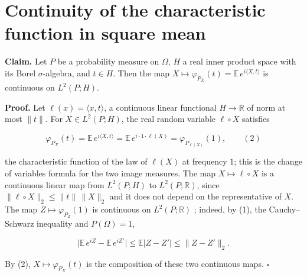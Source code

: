 \documentclass[11pt,a4paper]{article}
\begin{document}
\section{\texorpdfstring{Continuity of the characteristic function in square mean}{Continuity of the characteristic function in square mean}}


\textbf{Claim.} Let \(P\) be a probability measure on \(\Omega\), \(H\) a real inner product space with its Borel \(\sigma\)-algebra, and \(t\in H\). Then the map \(X\mapsto\varphi_{P_X}(t)=\mathbb E\,e^{i\langle X,t\rangle}\) is continuous on \(L^2(P;H)\).




\textbf{Proof.} Let \(\ell(x)=\langle x,t\rangle\), a continuous linear functional \(H\to\mathbb R\) of norm at most \(\|t\|\). For \(X\in L^2(P;H)\), the real random variable \(\ell\circ X\) satisfies


\[\varphi_{P_X}(t)=\mathbb E\,e^{i\langle X,t\rangle}=\mathbb E\,e^{i\cdot1\cdot\ell(X)}=\varphi_{P_{\ell(X)}}(1),\qquad(2)\]


the characteristic function of the law of \(\ell(X)\) at frequency \(1\); this is the change of variables formula for the two image measures. The map \(X\mapsto\ell\circ X\) is a continuous linear map from \(L^2(P;H)\) to \(L^2(P;\mathbb R)\), since \(\|\ell\circ X\|_2\le\|t\|\,\|X\|_2\) and it does not depend on the representative of \(X\). The map \(Z\mapsto\varphi_{P_Z}(1)\) is continuous on \(L^2(P;\mathbb R)\) \cite[Section~3.5.7]{LangevinLean2026ULASC}; indeed, by (1), the Cauchy–Schwarz inequality and \(P(\Omega)=1\),


\[\bigl|\mathbb E\,e^{iZ}-\mathbb E\,e^{iZ'}\bigr|\le\mathbb E|Z-Z'|\le\|Z-Z'\|_2 .\]


By (2), \(X\mapsto\varphi_{P_X}(t)\) is the composition of these two continuous maps. \(\square\)
\end{document}
